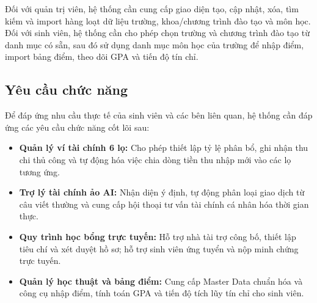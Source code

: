 Đối với quản trị viên, hệ thống cần cung cấp giao diện tạo, cập nhật, xóa, tìm kiếm và import hàng loạt dữ liệu trường, khoa/chương trình đào tạo và môn học. Đối với sinh viên, hệ thống cần cho phép chọn trường và chương trình đào tạo từ danh mục có sẵn, sau đó sử dụng danh mục môn học của trường để nhập điểm, import bảng điểm, theo dõi GPA và tiến độ tín chỉ.

\subsection{Yêu cầu chức năng}
Để đáp ứng nhu cầu thực tế của sinh viên và các bên liên quan, hệ thống cần đáp ứng các yêu cầu chức năng cốt lõi sau:
\begin{itemize}
    \item \textbf{Quản lý ví tài chính 6 lọ:} Cho phép thiết lập tỷ lệ phân bổ, ghi nhận thu chi thủ công và tự động hóa việc chia dòng tiền thu nhập mới vào các lọ tương ứng.
    \item \textbf{Trợ lý tài chính ảo AI:} Nhận diện ý định, tự động phân loại giao dịch từ câu viết thường và cung cấp hội thoại tư vấn tài chính cá nhân hóa thời gian thực.
    \item \textbf{Quy trình học bổng trực tuyến:} Hỗ trợ nhà tài trợ công bố, thiết lập tiêu chí và xét duyệt hồ sơ; hỗ trợ sinh viên ứng tuyển và nộp minh chứng trực tuyến.
    \item \textbf{Quản lý học thuật và bảng điểm:} Cung cấp Master Data chuẩn hóa và công cụ nhập điểm, tính toán GPA và tiến độ tích lũy tín chỉ cho sinh viên.
\end{itemize}

